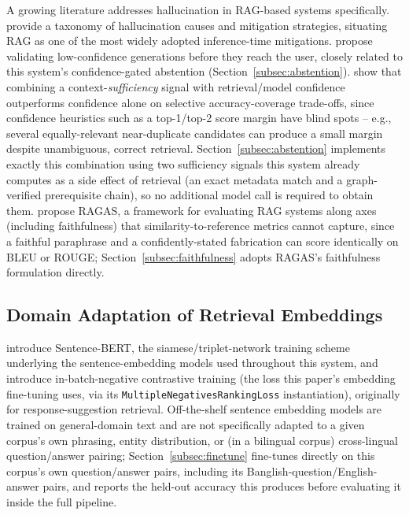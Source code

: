 \documentclass[a4paper,twoside]{article}
\begin{document}
A growing literature addresses hallucination in RAG-based systems specifically. \citet{huang2023} provide a taxonomy of hallucination causes and mitigation strategies, situating RAG as one of the most widely adopted inference-time mitigations. \citet{varshney2023} propose validating low-confidence generations before they reach the user, closely related to this system's confidence-gated abstention (Section~\ref{subsec:abstention}). \citet{joren2024} show that combining a context-\emph{sufficiency} signal with retrieval/model confidence outperforms confidence alone on selective accuracy-coverage trade-offs, since confidence heuristics such as a top-1/top-2 score margin have blind spots -- e.g., several equally-relevant near-duplicate candidates can produce a small margin despite unambiguous, correct retrieval. Section~\ref{subsec:abstention} implements exactly this combination using two sufficiency signals this system already computes as a side effect of retrieval (an exact metadata match and a graph-verified prerequisite chain), so no additional model call is required to obtain them. \citet{es2023ragas} propose RAGAS, a framework for evaluating RAG systems along axes (including faithfulness) that similarity-to-reference metrics cannot capture, since a faithful paraphrase and a confidently-stated fabrication can score identically on BLEU or ROUGE; Section~\ref{subsec:faithfulness} adopts RAGAS's faithfulness formulation directly.

\subsection{Domain Adaptation of Retrieval Embeddings}

\citet{reimers2019sbert} introduce Sentence-BERT, the siamese/triplet-network training scheme underlying the sentence-embedding models used throughout this system, and \citet{henderson2017mnr} introduce in-batch-negative contrastive training (the loss this paper's embedding fine-tuning uses, via its \texttt{MultipleNegativesRankingLoss} instantiation), originally for response-suggestion retrieval. Off-the-shelf sentence embedding models are trained on general-domain text and are not specifically adapted to a given corpus's own phrasing, entity distribution, or (in a bilingual corpus) cross-lingual question/answer pairing; Section~\ref{subsec:finetune} fine-tunes directly on this corpus's own question/answer pairs, including its Banglish-question/English-answer pairs, and reports the held-out accuracy this produces before evaluating it inside the full pipeline.
\end{document}
